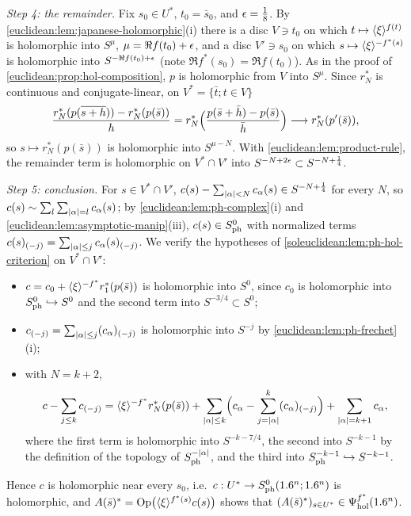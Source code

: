 \emph{Step 4: the remainder.} Fix $s_0\in U^*$, $t_0=\bar s_0$, and $\epsilon=\frac18$. By
\cref{euclidean:lem:japanese-holomorphic}(i) there is a disc $V\ni t_0$ on which
$t\mapsto\langle \xi\rangle^{f(t)}$ is holomorphic into $S^{\mu}$, $\mu=\Re f(t_0)+\epsilon$, and a disc
$V'\ni s_0$ on which $s\mapsto\langle \xi\rangle^{-f^*(s)}$ is holomorphic into
$S^{-\Re f(t_0)+\epsilon}$ (note $\Re f^*(s_0)=\Re f(t_0)$). As in the proof of
\cref{euclidean:prop:hol-composition}, $p$ is holomorphic from $V$ into $S^\mu$. Since
$r^*_N$ is continuous and conjugate-linear, on $V^*=\{\bar t;t\in V\}$
\begin{equation*}
  \frac{r^*_N(p(\overline{s+h}))-r^*_N(p(\bar s))}{h}
  =r^*_N\Bigl(\frac{p(\bar s+\bar h)-p(\bar s)}{\bar h}\Bigr)\longrightarrow r^*_N(p'(\bar s)),
\end{equation*}
so $s\mapsto r^*_N(p(\bar s))$ is holomorphic into $S^{\mu-N}$. With
\cref{euclidean:lem:product-rule}, the remainder term is holomorphic on $V^*\cap V'$ into
$S^{-N+2\epsilon}\subset S^{-N+\frac14}$.

\emph{Step 5: conclusion.} For $s\in V^*\cap V'$,
$c(s)-\sum_{\lvert \alpha\rvert<N}c_\alpha(s)\in S^{-N+\frac14}$ for every $N$, so
$c(s)\sim\sum_l\sum_{\lvert \alpha\rvert=l}c_\alpha(s)$; by \cref{euclidean:lem:ph-complex}(i) and
\cref{euclidean:lem:asymptotic-manip}(iii), $c(s)\in S^{0}_{\mathrm{ph}}$ with normalized terms
$c(s)_{(-j)}=\sum_{\lvert \alpha\rvert\le j}c_\alpha(s)_{(-j)}$. We verify the hypotheses of
\cref{soleuclidean:lem:ph-hol-criterion} on $V^*\cap V'$:
\begin{itemize}
\item $c=c_0+\langle \xi\rangle^{-f^*}r^*_1(p(\bar s))$ is holomorphic into $S^0$, since $c_0$ is
  holomorphic into $S^{0}_{\mathrm{ph}}\hookrightarrow S^0$ and the second term into $S^{-3/4}\subset S^0$;
\item $c_{(-j)}=\sum_{\lvert \alpha\rvert\le j}(c_\alpha)_{(-j)}$ is holomorphic into $S^{-j}$ by
  \cref{euclidean:lem:ph-frechet}(i);
\item with $N=k+2$,
  \begin{equation*}
    c-\sum_{j\le k}c_{(-j)}=\langle \xi\rangle^{-f^*}r^*_N(p(\bar s))
    +\sum_{\lvert \alpha\rvert\le k}\Bigl(c_\alpha-\sum_{j=\lvert \alpha\rvert}^k(c_\alpha)_{(-j)}\Bigr)
    +\sum_{\lvert \alpha\rvert=k+1}c_\alpha,
  \end{equation*}
  where the first term is holomorphic into $S^{-k-7/4}$, the second into $S^{-k-1}$ by the
  definition of the topology of $S^{-\lvert \alpha\rvert}_{\mathrm{ph}}$, and the third into
  $S^{-k-1}_{\mathrm{ph}}\hookrightarrow S^{-k-1}$.
\end{itemize}
Hence $c$ is holomorphic near every $s_0$, i.e.\ $c:U^*\to S^{0}_{\mathrm{ph}}(1.6^n;1.6^n)$ is
holomorphic, and
$A(\bar s)^*=\operatorname{Op}\bigl(\langle \xi\rangle^{f^*(s)}c(s)\bigr)$ shows that
$(A(\bar s)^*)_{s\in U^*}\in\Psi^{f^*}_{\mathrm{hol}}(1.6^n)$.

